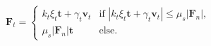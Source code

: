 \begin{equation}
\mathbf{F}_t = 
 \begin{cases}
k_t \xi_t \mathbf{t} + \gamma_t \mathbf{v}_t  & \text{if } |k_t \xi_t \mathbf{t}
+ \gamma_t \mathbf{v}_t| \leq \mu_s |\mathbf{F}_n| ,\\
 \mu_s |\mathbf{F}_n| \mathbf{t} & \text{else.}
\end{cases}
 \label{eq:ft}
\end{equation}
